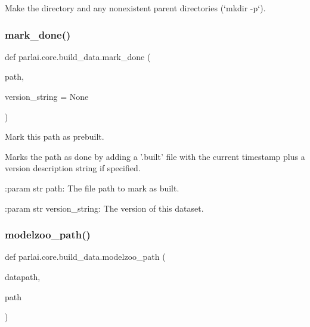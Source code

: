 \begin{DoxyVerb}Make the directory and any nonexistent parent directories (`mkdir -p`).
\end{DoxyVerb}
 \mbox{\label{namespaceparlai_1_1core_1_1build__data_a2527e6d29b0ccb7b841182890ac36a59}} 
\subsubsection{\texorpdfstring{mark\+\_\+done()}{mark\_done()}}
{\footnotesize\ttfamily def parlai.\+core.\+build\+\_\+data.\+mark\+\_\+done (\begin{DoxyParamCaption}\item[{}]{path,  }\item[{}]{version\+\_\+string = {\ttfamily None} }\end{DoxyParamCaption})}

\begin{DoxyVerb}Mark this path as prebuilt.

Marks the path as done by adding a '.built' file with the current timestamp
plus a version description string if specified.

:param str path:
    The file path to mark as built.

:param str version_string:
    The version of this dataset.
\end{DoxyVerb}
 \mbox{\label{namespaceparlai_1_1core_1_1build__data_ad06e9e38ca85db9c4a676ccd9ae41649}} 
\subsubsection{\texorpdfstring{modelzoo\+\_\+path()}{modelzoo\_path()}}
{\footnotesize\ttfamily def parlai.\+core.\+build\+\_\+data.\+modelzoo\+\_\+path (\begin{DoxyParamCaption}\item[{}]{datapath,  }\item[{}]{path }\end{DoxyParamCaption})}

